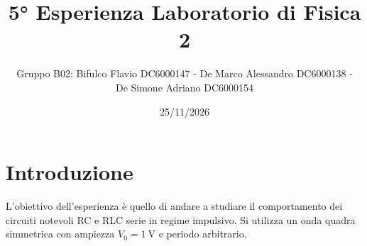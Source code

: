\documentclass[12pt, a4paper]{article}
\title{5° Esperienza Laboratorio di Fisica 2} %
\author{Gruppo B02: Bifulco Flavio DC6000147 - De Marco Alessandro DC6000138 - \\ De Simone Adriano DC6000154}
\date{25/11/2026} %
\begin{document}
\maketitle
%
%

\section{Introduzione}
L'obiettivo dell'esperienza è quello di andare a studiare il comportamento dei circuiti notevoli RC e RLC serie in regime impulsivo.
Si utilizza un onda quadra simmetrica con ampiezza \(V_0=\qty{1}{\volt}\) e periodo arbitrario.
\end{document}
